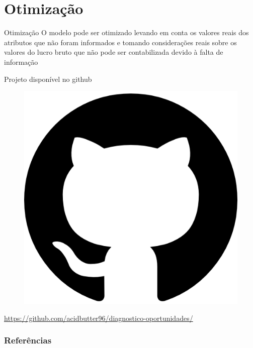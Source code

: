\documentclass[compress]{beamer}
\begin{document}
\section{Otimização}
\begin{frame}{Otimização}
    O modelo pode ser otimizado levando em conta os valores reais dos atributos que não foram informados e tomando considerações reais sobre os valores do lucro bruto que não pode ser contabilizada devido à falta de informação
\end{frame}
\begin{frame}{}
    \begin{center}
    Projeto disponível no github
    \begin{figure}[h!]
        \centering
        \includegraphics[scale=.1]{img/github-mark.png}
    \end{figure}
    \url{https://github.com/acidbutter96/diagnostico-oportunidades/}
    \end{center}
\end{frame}




\begin{frame}[allowframebreaks]
\frametitle{Referências}


\end{frame}
\end{document}
